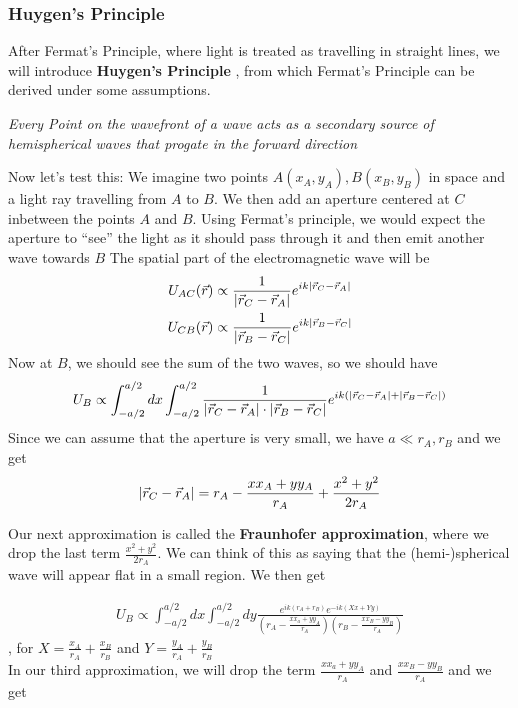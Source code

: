 \subsubsection{Huygen's Principle}
After Fermat's Principle, where light is treated as travelling in straight lines, we will introduce \textbf{Huygen's Principle} , from which Fermat's Principle can be derived under some assumptions.
\begin{center}
	\emph{Every Point on the wavefront of a wave acts as a secondary source of hemispherical waves that progate in the forward direction}
\end{center}
Now let's test this: We imagine two points $A(x_A,y_A),B(x_B,y_B)$ in space and a light ray travelling from $A$ to $B$.
We then add an aperture centered at $C$ inbetween the points $A$ and $B$. Using Fermat's principle, we would expect the aperture to ``see'' the light as it should pass through it and then emit another wave towards $B$
The spatial part of the electromagnetic wave will be
\begin{align*}
				U_{AC}(\vec{r}) &\propto \frac{1}{\vert\vec{r}_C - \vec{r}_A\vert} e^{ik \vert\vec{r}_C - \vec{r}_A\vert}\\
				U_{CB}(\vec{r}) & \propto \frac{1}{\vert\vec{r}_B - \vec{r}_C\vert} e^{ik \vert\vec{r}_B - \vec{r}_C\vert}
\end{align*}
Now at $B$, we should see the sum of the two waves, so we should have
\begin{align*}
U_B \propto \int_{-a/2}^{a/2}dx \int_{-a/2}^{a/2} \frac{1}{\vert\vec{r}_C - \vec{r}_A\vert \cdot \vert\vec{r}_B - \vec{r}_C\vert}e^{ik(\vert\vec{r}_C - \vec{r}_A\vert + \vert\vec{r}_B - \vec{r}_C\vert)}
\end{align*}
Since we can assume that the aperture is very small, we have $a \ll r_A,r_B$ and we get
\begin{align*}
\vert\vec{r}_C - \vec{r}_A\vert = r_A - \frac{x x_A + yy_A}{r_A} + \frac{x^2 + y^2}{2r_A}
\end{align*}

Our next approximation is called the \textbf{Fraunhofer approximation}, where we drop the last term $\frac{x^2 + y^2}{2r_A}$. We can think of this as saying that the (hemi-)spherical wave will appear flat in a small region. We then get

\begin{align*}
	U_B \propto \int_{-a/2}^{a/2} dx \int_{-a/2}^{a/2}dy \frac{e^{ik(r_A + r_B)}e^{-ik(Xx + Yy)}}{ \left(r_A - \frac{xx_a + yy_A}{r_A}\right) \left(r_B - \frac{xx_B - yy_B}{r_A}\right)}
\end{align*}
, for $X = \frac{x_A}{r_A} + \frac{x_B}{r_B}$ and $Y = \frac{y_A}{r_A} + \frac{y_B}{r_B}$\\
In our third approximation, we will drop the term $\frac{xx_a + yy_A}{r_A}$ and $\frac{xx_B - yy_B}{r_A}$ and we get\\


